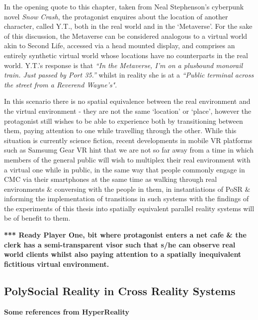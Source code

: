 In the opening quote to this chapter, taken from Neal Stephenson's cyberpunk novel \textit{Snow Crash}, the protagonist enquires about the location of another character, called Y.T., both in the real world and in the `Metaverse'. For the sake of this discussion, the Metaverse can be considered analogous to a virtual world akin to Second Life, accessed via a head mounted display, and comprises an entirely synthetic virtual world whose locations have no counterparts in the real world. Y.T.'s response is that \textit{``In  the Metaverse, I'm on a plusbound monorail train. Just passed by Port 35.''} whilst in reality she is at a \textit{``Public terminal across the street from a Reverend Wayne's"}.

In this scenario there is no spatial equivalence between the real environment and the virtual environment - they are not the same `location' or `place', however the protagonist still wishes to be able to experience both by transitioning between them, paying attention to one while travelling through the other. While this situation is currently science fiction, recent developments in mobile VR platforms such as Samsumg Gear VR hint that we are not so far away from a time in which members of the general public will wish to multiplex their real environment with a virtual one while in public, in the same way that people commonly engage in CMC via their smartphones at the same time as walking through real environments \& conversing with the people in them, in instantiations of PoSR \& informing the implementation of transitions in such systems with the findings of the experiments of this thesis into spatially equivalent parallel reality systems will be of benefit to them.

\textbf{*** Ready Player One, bit where protagonist enters a net cafe \& the clerk has a semi-transparent visor such that s/he can observe real world clients whilst also paying attention to a spatially inequivalent fictitious virtual environment.}


\subsection{PolySocial Reality in Cross Reality Systems}

\textbf{Some references from HyperReality}


